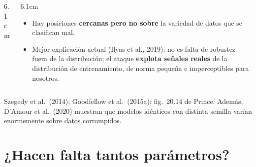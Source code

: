 \documentclass[aspectratio=169, 10pt]{beamer}
\newcommand{\fuente}[1]{{\scriptsize\color{StanfordGray}#1}}
\begin{document}
\begin{frame}
\begin{columns}[T]
\begin{column}{6.1cm}
\begin{itemize}
\end{itemize}
\end{column}
\begin{column}{6.1cm}
\begin{itemize}
	\item Hay posiciones \textbf{cercanas pero no sobre} la variedad de datos que se clasifican mal.
	\item Mejor explicaci\'on actual (Ilyas et al., 2019): no es falta de robustez fuera de la distribuci\'on; el ataque \textbf{explota se\~nales reales} de la distribuci\'on de entrenamiento, de norma peque\~na e imperceptibles para nosotros.
\end{itemize}
\end{column}
\end{columns}
\vspace{0.2em}
\fuente{Szegedy et al.\ (2014); Goodfellow et al.\ (2015a); fig.~20.14 de Prince. Adem\'as, D'Amour et al.\ (2020) muestran que modelos id\'enticos con distinta semilla var\'ian enormemente sobre datos corrompidos.}
\end{frame}

\section{¿Hacen falta tantos parámetros?}
\end{document}
